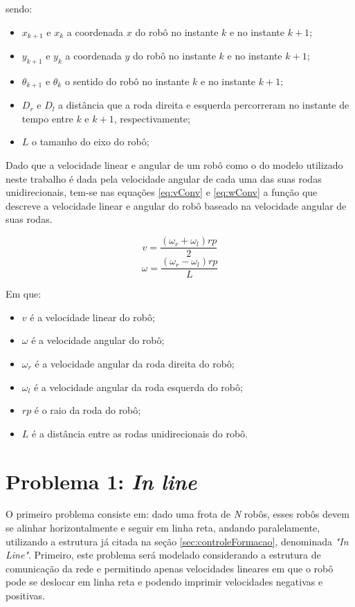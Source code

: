 sendo:
\begin{itemize}
	\item $x_{k+1}$ e $x_{k}$ a coordenada $x$ do robô no instante $k$ e no instante $k+1$;
	\item $y_{k+1}$ e $y_{k}$ a coordenada $y$ do robô no instante $k$ e no instante $k+1$;
	\item $\theta_{k+1}$ e $\theta_{k}$ o sentido do robô no instante $k$ e no instante $k+1$;	
	\item $D_{r}$ e $D_{l}$ a distância que a roda direita e esquerda percorreram no instante de tempo entre $k$ e $k+1$, respectivamente;
	\item $L$ o tamanho do eixo do robô;
\end{itemize}

Dado que a velocidade linear e angular de um robô como o do modelo utilizado neste trabalho é dada pela velocidade angular de cada uma das suas rodas unidirecionais, tem-se nas equações \ref{eq:vConv} e \ref{eq:wConv} a função que descreve a velocidade linear e angular do robô baseado na velocidade angular de suas rodas.

\begin{equation}
v = \dfrac{(\omega_{r} + \omega_{l}) rp}{2}
\label{eq:vConv}
\end{equation}
\begin{equation}
\omega = \dfrac{(\omega_{r} - \omega_{l}) rp}{L}
\label{eq:wConv}
\end{equation}

Em que:
\begin{itemize}
	\item $v$ é a velocidade linear do robô;
	\item $\omega$ é a velocidade angular do robô;
	\item $\omega_{r}$ é a velocidade angular da roda direita do robô;
	\item $\omega_{l}$ é a velocidade angular da roda esquerda do robô;
	\item $rp$ é o raio da roda do robô;
	\item $L$ é a distância entre as rodas unidirecionais do robô.
\end{itemize}

\section{Problema 1: \emph{In line}}
\label{sec:P1}
O primeiro problema consiste em: dado uma frota de \emph{N} robôs, esses robôs devem se alinhar horizontalmente e seguir em linha reta, andando paralelamente, utilizando a estrutura já citada na seção \ref{sec:controleFormacao}, denominada \emph{"In Line"}. Primeiro, este problema será modelado considerando a estrutura de comunicação da rede e permitindo apenas velocidades lineares em que o robô pode se deslocar em linha reta e podendo imprimir velocidades negativas e positivas. 

